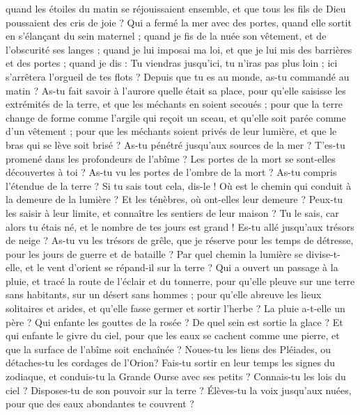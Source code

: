 \begin{multicols}{2}
quand les étoiles du matin se réjouissaient ensemble, et que tous les fils de Dieu poussaient des cris de joie ?
Qui a fermé la mer avec des portes, quand elle sortit en s'élançant du sein maternel ;
quand je fis de la nuée son vêtement, et de l'obscurité ses langes ;
quand je lui imposai ma loi, et que je lui mis des barrières et des portes ;
quand je dis : Tu viendras jusqu'ici, tu n'iras pas plus loin ; ici s'arrêtera l'orgueil de tes flots ?
Depuis que tu es au monde, as-tu commandé au matin ? As-tu fait savoir à l'aurore quelle était sa place,
pour qu'elle saisisse les extrémités de la terre, et que les méchants en soient secoués ;
pour que la terre change de forme comme l'argile qui reçoit un sceau, et qu'elle soit parée comme d'un vêtement ;
pour que les méchants soient privés de leur lumière, et que le bras qui se lève soit brisé ?
As-tu pénétré jusqu'aux sources de la mer ? T'es-tu promené dans les profondeurs de l'abîme ?
Les portes de la mort se sont-elles découvertes à toi ? As-tu vu les portes de l'ombre de la mort ?
As-tu compris l'étendue de la terre ? Si tu sais tout cela, dis-le !
Où est le chemin qui conduit à la demeure de la lumière ? Et les ténèbres, où ont-elles leur demeure ?
Peux-tu les saisir à leur limite, et connaître les sentiers de leur maison ?
Tu le sais, car alors tu étais né, et le nombre de tes jours est grand !
Es-tu allé jusqu'aux trésors de neige ? As-tu vu les trésors de grêle,
que je réserve pour les temps de détresse, pour les jours de guerre et de bataille ?
Par quel chemin la lumière se divise-t-elle, et le vent d'orient se répand-il sur la terre ?
Qui a ouvert un passage à la pluie, et tracé la route de l'éclair et du tonnerre,
pour qu'elle pleuve sur une terre sans habitants, sur un désert sans hommes ;
pour qu'elle abreuve les lieux solitaires et arides, et qu'elle fasse germer et sortir l'herbe ?
La pluie a-t-elle un père ? Qui enfante les gouttes de la rosée ?
De quel sein est sortie la glace ? Et qui enfante le givre du ciel,
pour que les eaux se cachent comme une pierre, et que la surface de l'abîme soit enchaînée ?
Noues-tu les liens des Pléiades, ou détaches-tu les cordages de l'Orion?
Fais-tu sortir en leur temps les signes du zodiaque, et conduis-tu la Grande Ourse avec ses petits ?
Connais-tu les lois du ciel ? Disposes-tu de son pouvoir sur la terre ?
Élèves-tu la voix jusqu'aux nuées, pour que des eaux abondantes te couvrent ?

\end{multicols}
